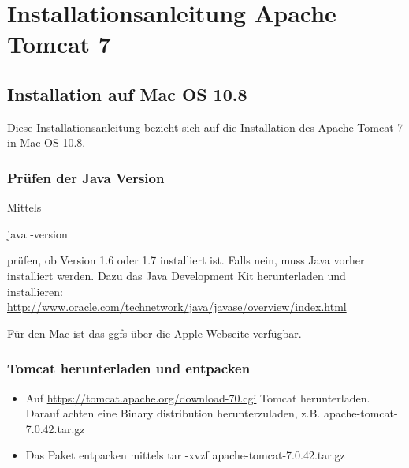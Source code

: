 \chapter{Installationsanleitung Apache Tomcat 7}\label{kap:anhangtomcat}


\section{Installation auf Mac OS 10.8}

Diese Installationsanleitung bezieht sich auf die Installation des Apache Tomcat 7 in Mac OS 10.8. 

\subsection{Prüfen der Java Version}

Mittels 

java -version

prüfen, ob Version 1.6 oder 1.7 installiert ist. Falls nein, muss Java vorher installiert werden. Dazu das Java Development Kit herunterladen und installieren: \href{http://www.oracle.com/technetwork/java/javase/overview/index.html}{http://www.oracle.com/technetwork/java/javase/overview/index.html}

Für den Mac ist das ggfs über die Apple Webseite verfügbar. 

\subsection{Tomcat herunterladen und entpacken}

\begin{itemize}
\item Auf \href{https://tomcat.apache.org/download-70.cgi}{https://tomcat.apache.org/download-70.cgi} Tomcat herunterladen. Darauf achten eine Binary distribution herunterzuladen, z.B. apache-tomcat-7.0.42.tar.gz
\item Das Paket entpacken mittels tar -xvzf apache-tomcat-7.0.42.tar.gz
\end{itemize}

